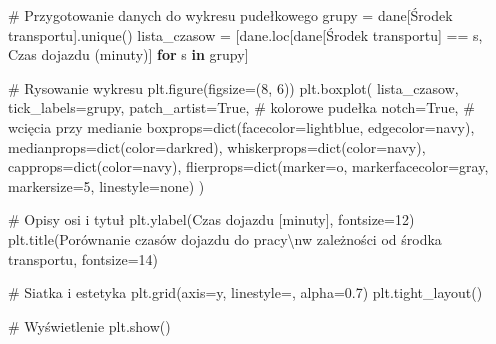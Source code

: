 \documentclass[
  polish,
  letterpaper,
  DIV=11,
  numbers=noendperiod]{scrreprt}
\newenvironment{Shaded}{\begin{snugshade}}{\end{snugshade}}
\newcommand{\BuiltInTok}[1]{\textcolor[rgb]{0.00,0.23,0.31}{#1}}
\newcommand{\CharTok}[1]{\textcolor[rgb]{0.13,0.47,0.30}{#1}}
\newcommand{\CommentTok}[1]{\textcolor[rgb]{0.37,0.37,0.37}{#1}}
\newcommand{\ControlFlowTok}[1]{\textcolor[rgb]{0.00,0.23,0.31}{\textbf{#1}}}
\newcommand{\DecValTok}[1]{\textcolor[rgb]{0.68,0.00,0.00}{#1}}
\newcommand{\FloatTok}[1]{\textcolor[rgb]{0.68,0.00,0.00}{#1}}
\newcommand{\KeywordTok}[1]{\textcolor[rgb]{0.00,0.23,0.31}{\textbf{#1}}}
\newcommand{\NormalTok}[1]{\textcolor[rgb]{0.00,0.23,0.31}{#1}}
\newcommand{\OperatorTok}[1]{\textcolor[rgb]{0.37,0.37,0.37}{#1}}
\newcommand{\StringTok}[1]{\textcolor[rgb]{0.13,0.47,0.30}{#1}}
\newcommand{\VariableTok}[1]{\textcolor[rgb]{0.07,0.07,0.07}{#1}}
\begin{document}
\begin{Shaded}
\begin{Highlighting}[]
\CommentTok{\# Przygotowanie danych do wykresu pudełkowego}
\NormalTok{grupy }\OperatorTok{=}\NormalTok{ dane[}\StringTok{\textquotesingle{}Środek transportu\textquotesingle{}}\NormalTok{].unique()}
\NormalTok{lista\_czasow }\OperatorTok{=}\NormalTok{ [dane.loc[dane[}\StringTok{\textquotesingle{}Środek transportu\textquotesingle{}}\NormalTok{] }\OperatorTok{==}\NormalTok{ s, }\StringTok{\textquotesingle{}Czas dojazdu (minuty)\textquotesingle{}}\NormalTok{]}
                \ControlFlowTok{for}\NormalTok{ s }\KeywordTok{in}\NormalTok{ grupy]}

\CommentTok{\# Rysowanie wykresu}
\NormalTok{plt.figure(figsize}\OperatorTok{=}\NormalTok{(}\DecValTok{8}\NormalTok{, }\DecValTok{6}\NormalTok{))}
\NormalTok{plt.boxplot(}
\NormalTok{    lista\_czasow,}
\NormalTok{    tick\_labels}\OperatorTok{=}\NormalTok{grupy,}
\NormalTok{    patch\_artist}\OperatorTok{=}\VariableTok{True}\NormalTok{,    }\CommentTok{\# kolorowe pudełka}
\NormalTok{    notch}\OperatorTok{=}\VariableTok{True}\NormalTok{,           }\CommentTok{\# wcięcia przy medianie}
\NormalTok{    boxprops}\OperatorTok{=}\BuiltInTok{dict}\NormalTok{(facecolor}\OperatorTok{=}\StringTok{\textquotesingle{}lightblue\textquotesingle{}}\NormalTok{, edgecolor}\OperatorTok{=}\StringTok{\textquotesingle{}navy\textquotesingle{}}\NormalTok{),}
\NormalTok{    medianprops}\OperatorTok{=}\BuiltInTok{dict}\NormalTok{(color}\OperatorTok{=}\StringTok{\textquotesingle{}darkred\textquotesingle{}}\NormalTok{),}
\NormalTok{    whiskerprops}\OperatorTok{=}\BuiltInTok{dict}\NormalTok{(color}\OperatorTok{=}\StringTok{\textquotesingle{}navy\textquotesingle{}}\NormalTok{),}
\NormalTok{    capprops}\OperatorTok{=}\BuiltInTok{dict}\NormalTok{(color}\OperatorTok{=}\StringTok{\textquotesingle{}navy\textquotesingle{}}\NormalTok{),}
\NormalTok{    flierprops}\OperatorTok{=}\BuiltInTok{dict}\NormalTok{(marker}\OperatorTok{=}\StringTok{\textquotesingle{}o\textquotesingle{}}\NormalTok{, markerfacecolor}\OperatorTok{=}\StringTok{\textquotesingle{}gray\textquotesingle{}}\NormalTok{, markersize}\OperatorTok{=}\DecValTok{5}\NormalTok{, linestyle}\OperatorTok{=}\StringTok{\textquotesingle{}none\textquotesingle{}}\NormalTok{)}
\NormalTok{)}

\CommentTok{\# Opisy osi i tytuł}
\NormalTok{plt.ylabel(}\StringTok{\textquotesingle{}Czas dojazdu [minuty]\textquotesingle{}}\NormalTok{, fontsize}\OperatorTok{=}\DecValTok{12}\NormalTok{)}
\NormalTok{plt.title(}\StringTok{\textquotesingle{}Porównanie czasów dojazdu do pracy}\CharTok{\textbackslash{}n}\StringTok{w zależności od środka transportu\textquotesingle{}}\NormalTok{, fontsize}\OperatorTok{=}\DecValTok{14}\NormalTok{)}

\CommentTok{\# Siatka i estetyka}
\NormalTok{plt.grid(axis}\OperatorTok{=}\StringTok{\textquotesingle{}y\textquotesingle{}}\NormalTok{, linestyle}\OperatorTok{=}\StringTok{\textquotesingle{}{-}{-}\textquotesingle{}}\NormalTok{, alpha}\OperatorTok{=}\FloatTok{0.7}\NormalTok{)}
\NormalTok{plt.tight\_layout()}

\CommentTok{\# Wyświetlenie}
\NormalTok{plt.show()}
\end{Highlighting}
\end{Shaded}
\end{document}
